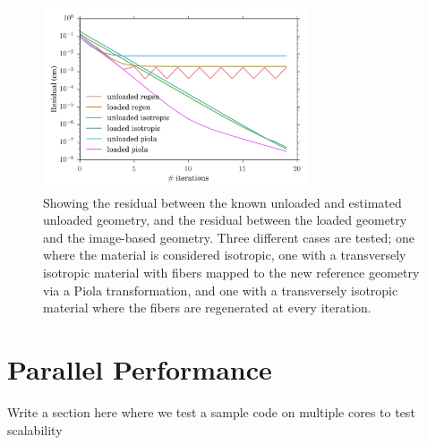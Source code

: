 

\begin{figure}[htbp]
  \centering
    \includegraphics[width=0.7\textwidth]{numerical_experiments/unloading/unloaded_error.png}
\caption{Showing the residual between the known unloaded and estimated
unloaded geometry, and the residual between the loaded geometry and
the image-based geometry. Three different cases are tested; one where
the material is considered isotropic, one with a transversely
isotropic material with fibers mapped to the new reference geometry via
a Piola transformation, and one with a transversely
isotropic material where the fibers are regenerated at
every iteration. }
\label{fig:unloaded_error}
\end{figure}



\section{Parallel Performance}
Write a section here where we test a sample code on multiple cores to
test scalability

